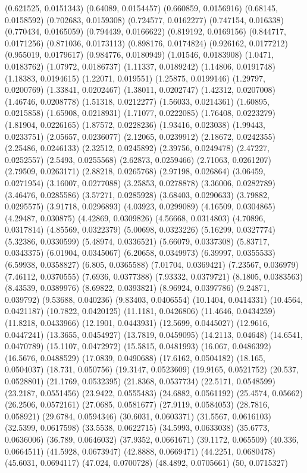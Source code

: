 {(0.621525, 0.0151343)
(0.64089, 0.0154457)
(0.660859, 0.0156916)
(0.68145, 0.0158592)
(0.702683, 0.0159308)
(0.724577, 0.0162277)
(0.747154, 0.016338)
(0.770434, 0.0165059)
(0.794439, 0.0166622)
(0.819192, 0.0169156)
(0.844717, 0.0171256)
(0.871036, 0.0173113)
(0.898176, 0.0174824)
(0.926162, 0.0177212)
(0.955019, 0.0179617)
(0.984776, 0.0180949)
(1.01546, 0.0183908)
(1.0471, 0.0183762)
(1.07972, 0.0186737)
(1.11337, 0.0189242)
(1.14806, 0.0191748)
(1.18383, 0.0194615)
(1.22071, 0.019551)
(1.25875, 0.0199146)
(1.29797, 0.0200769)
(1.33841, 0.0202467)
(1.38011, 0.0202747)
(1.42312, 0.0207008)
(1.46746, 0.0208778)
(1.51318, 0.0212277)
(1.56033, 0.0214361)
(1.60895, 0.0215858)
(1.65908, 0.0218931)
(1.71077, 0.0222085)
(1.76408, 0.0223279)
(1.81904, 0.0226165)
(1.87572, 0.0228236)
(1.93416, 0.023038)
(1.99443, 0.0233751)
(2.05657, 0.0236077)
(2.12065, 0.0239912)
(2.18672, 0.0242355)
(2.25486, 0.0246133)
(2.32512, 0.0245892)
(2.39756, 0.0249478)
(2.47227, 0.0252557)
(2.5493, 0.0255568)
(2.62873, 0.0259466)
(2.71063, 0.0261207)
(2.79509, 0.0263171)
(2.88218, 0.0265768)
(2.97198, 0.026864)
(3.06459, 0.0271954)
(3.16007, 0.0277088)
(3.25853, 0.0278878)
(3.36006, 0.0282789)
(3.46476, 0.0285586)
(3.57271, 0.0285928)
(3.68403, 0.0290633)
(3.79882, 0.0295575)
(3.91718, 0.0296893)
(4.03923, 0.0299089)
(4.16509, 0.0304865)
(4.29487, 0.030875)
(4.42869, 0.0309826)
(4.56668, 0.0314803)
(4.70896, 0.0317814)
(4.85569, 0.0322379)
(5.00698, 0.0323226)
(5.16299, 0.0327774)
(5.32386, 0.0330599)
(5.48974, 0.0336521)
(5.66079, 0.0337308)
(5.83717, 0.0343375)
(6.01904, 0.0345067)
(6.20658, 0.0349973)
(6.39997, 0.0355533)
(6.59938, 0.0358827)
(6.805, 0.0365588)
(7.01704, 0.0369421)
(7.23567, 0.036979)
(7.46112, 0.0370555)
(7.6936, 0.0377388)
(7.93332, 0.0379721)
(8.1805, 0.0383563)
(8.43539, 0.0389976)
(8.69822, 0.0393821)
(8.96924, 0.0397786)
(9.24871, 0.039792)
(9.53688, 0.040236)
(9.83403, 0.0406554)
(10.1404, 0.0414331)
(10.4564, 0.0421187)
(10.7822, 0.0420125)
(11.1181, 0.0426806)
(11.4646, 0.0434259)
(11.8218, 0.0433966)
(12.1901, 0.0443931)
(12.5699, 0.0445027)
(12.9616, 0.0447241)
(13.3655, 0.0454927)
(13.7819, 0.0459095)
(14.2113, 0.04648)
(14.6541, 0.0470789)
(15.1107, 0.0472972)
(15.5815, 0.0481993)
(16.067, 0.0486392)
(16.5676, 0.0488529)
(17.0839, 0.0490688)
(17.6162, 0.0504182)
(18.165, 0.0504037)
(18.731, 0.050756)
(19.3147, 0.0523609)
(19.9165, 0.0521752)
(20.537, 0.0528801)
(21.1769, 0.0532395)
(21.8368, 0.0537734)
(22.5171, 0.0548599)
(23.2187, 0.0551456)
(23.9422, 0.0555483)
(24.6882, 0.0561192)
(25.4574, 0.05662)
(26.2506, 0.0572161)
(27.0685, 0.0581677)
(27.9119, 0.0584053)
(28.7816, 0.058921)
(29.6784, 0.0594346)
(30.6031, 0.0603371)
(31.5567, 0.0616103)
(32.5399, 0.0617598)
(33.5538, 0.0622715)
(34.5993, 0.0633038)
(35.6773, 0.0636006)
(36.789, 0.0646032)
(37.9352, 0.0661671)
(39.1172, 0.065509)
(40.336, 0.0664511)
(41.5928, 0.0673947)
(42.8888, 0.0669471)
(44.2251, 0.0680478)
(45.6031, 0.0694117)
(47.024, 0.0700728)
(48.4892, 0.0705661)
(50, 0.0715327)
}

